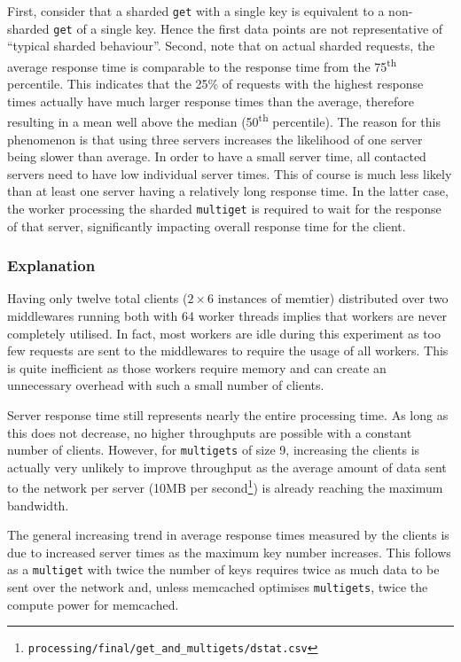 \documentclass[11pt,a4paper]{article}
\begin{document}
First, consider that a sharded \texttt{get} with a single key is equivalent to a non-sharded \texttt{get} of a single key. Hence the first data points are not representative of ``typical sharded behaviour''. Second, note that on actual sharded requests, the average response time is comparable to the response time from the 75\textsuperscript{th} percentile. This indicates that the 25\% of requests with the highest response times actually have much larger response times than the average, therefore resulting in a mean well above the median (50\textsuperscript{th} percentile). The reason for this phenomenon is that using three servers increases the likelihood of one server being slower than average.  In order to have a small server time, all contacted servers need to have low individual server times. This of course is much less likely than at least one server having a relatively long response time. In the latter case, the worker processing the sharded \texttt{multiget} is required to wait for the response of that server, significantly impacting overall response time for the client.

\subsubsection{Explanation}
Having only twelve total clients ($2\times6$ instances of memtier) distributed over two middlewares running both with 64 worker threads implies that workers are never completely utilised. In fact, most workers are idle during this experiment as too few requests are sent to the middlewares to require the usage of all workers. This is quite inefficient as those workers require memory and can create an unnecessary overhead with such a small number of clients.

Server response time still represents nearly the entire processing time. As long as this does not decrease, no higher throughputs are possible with a constant number of clients. However, for \texttt{multigets} of size 9, increasing the clients is actually very unlikely to improve throughput as the average amount of data sent to the network per server (10MB per second\footnote{\texttt{processing/final/get_and_multigets/dstat.csv}}) is already reaching the maximum bandwidth.

The general increasing trend in average response times measured by the clients is due to increased server times as the maximum key number increases. This follows as a \texttt{multiget} with twice the number of keys requires twice as much data to be sent over the network and, unless memcached optimises \texttt{multigets}, twice the compute power for memcached.
\end{document}
